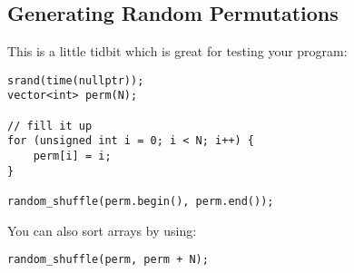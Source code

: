 \subsection{Generating Random Permutations}
This is a little tidbit which is great for testing your program:
\begin{lstlisting}[style=C++]
srand(time(nullptr));
vector<int> perm(N);

// fill it up
for (unsigned int i = 0; i < N; i++) {
    perm[i] = i;
}

random_shuffle(perm.begin(), perm.end());
\end{lstlisting}
You can also sort arrays by using:
\begin{lstlisting}[style=C++]
random_shuffle(perm, perm + N);
\end{lstlisting}